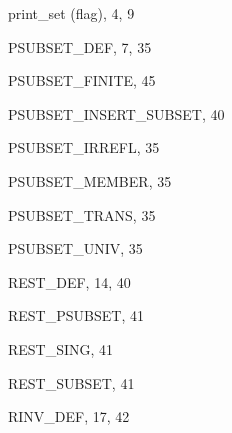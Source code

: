\begin{theindex}
  \indexspace

  \item {\ptt print\_set} (flag), 4, 9
  \item {\ptt PSUBSET\_DEF}, 7, 35
  \item {\ptt PSUBSET\_FINITE}, 45
  \item {\ptt PSUBSET\_INSERT\_SUBSET}, 40
  \item {\ptt PSUBSET\_IRREFL}, 35
  \item {\ptt PSUBSET\_MEMBER}, 35
  \item {\ptt PSUBSET\_TRANS}, 35
  \item {\ptt PSUBSET\_UNIV}, 35

  \indexspace

  \item {\ptt REST\_DEF}, 14, 40
  \item {\ptt REST\_PSUBSET}, 41
  \item {\ptt REST\_SING}, 41
  \item {\ptt REST\_SUBSET}, 41
  \item {\ptt RINV\_DEF}, 17, 42

  \indexspace


\end{theindex}
